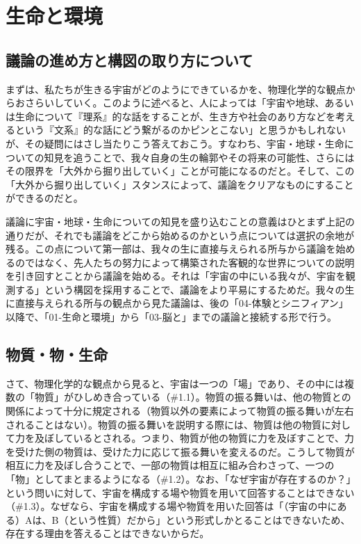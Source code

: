 \section{生命と環境}\label{ux751fux547dux3068ux74b0ux5883}

\subsection{議論の進め方と構図の取り方について}\label{ux8b70ux8ad6ux306eux9032ux3081ux65b9ux3068ux69cbux56f3ux306eux53d6ux308aux65b9ux306bux3064ux3044ux3066}

まずは、私たちが生きる宇宙がどのようにできているかを、物理化学的な観点からおさらいしていく。このように述べると、人によっては「宇宙や地球、あるいは生命について『理系』的な話をすることが、生き方や社会のあり方などを考えるという『文系』的な話にどう繋がるのかピンとこない」と思うかもしれないが、その疑問にはさし当たりこう答えておこう。すなわち、宇宙・地球・生命についての知見を追うことで、我々自身の生の輪郭やその将来の可能性、さらにはその限界を「大外から掘り出していく」ことが可能になるのだと。そして、この「大外から掘り出していく」スタンスによって、議論をクリアなものにすることができるのだと。

議論に宇宙・地球・生命についての知見を盛り込むことの意義はひとまず上記の通りだが、それでも議論をどこから始めるのかという点については選択の余地が残る。この点について第一部は、我々の生に直接与えられる所与から議論を始めるのではなく、先人たちの努力によって構築された客観的な世界についての説明を引き回すとことから議論を始める。それは「宇宙の中にいる我々が、宇宙を観測する」という構図を採用することで、議論をより平易にするためだ。我々の生に直接与えられる所与の観点から見た議論は、後の「04-体験とシニフィアン」以降で、「01-生命と環境」から「03-脳と」までの議論と接続する形で行う。

\subsection{物質・物・生命}\label{ux7269ux8ceaux7269ux751fux547d}

さて、物理化学的な観点から見ると、宇宙は一つの「場」であり、その中には複数の「物質」がひしめき合っている（\#1.1）。物質の振る舞いは、他の物質との関係によって十分に規定される（物質以外の要素によって物質の振る舞いが左右されることはない）。物質の振る舞いを説明する際には、物質は他の物質に対して力を及ぼしているとされる。つまり、物質が他の物質に力を及ぼすことで、力を受けた側の物質は、受けた力に応じて振る舞いを変えるのだ。こうして物質が相互に力を及ぼし合うことで、一部の物質は相互に組み合わさって、一つの「物」としてまとまるようになる（\#1.2）。なお、「なぜ宇宙が存在するのか？」という問いに対して、宇宙を構成する場や物質を用いて回答することはできない（\#1.3）。なぜなら、宇宙を構成する場や物質を用いた回答は「（宇宙の中にある）Aは、B（という性質）だから」という形式しかとることはできないため、存在する理由を答えることはできないからだ。

